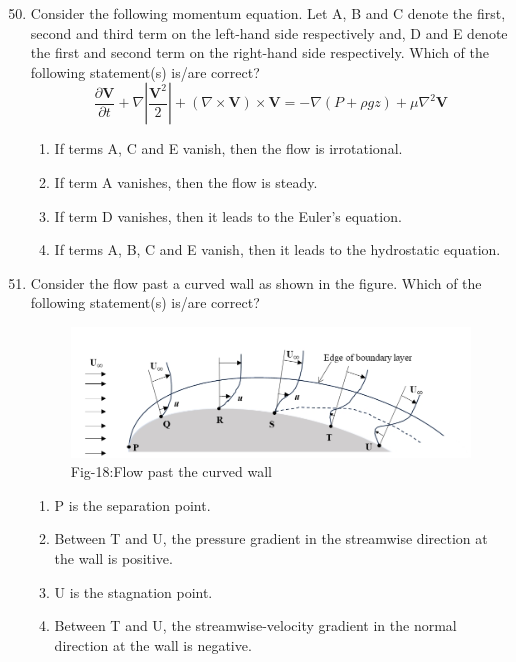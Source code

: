 \documentclass[journal]{IEEEtran}
\theoremstyle{remark}
\begin{document}
\begin{enumerate}[itemsep=1em]
\setcounter{enumi}{49}
\item Consider the following momentum equation. Let A, B and C denote the first, second and third term on the left-hand side respectively and, D and E denote the first and second term on the right-hand side respectively. Which of the following statement(s) is/are correct?  
\[
\frac{\partial \mathbf{V}}{\partial t}
+ \nabla \left| \frac{\mathbf{V}^2}{2} \right|
+ \left( \nabla \times \mathbf{V} \right) \times \mathbf{V}
= -\nabla \left( P + \rho g z \right)
+ \mu \nabla^2 \mathbf{V}
\]

\begin{enumerate}[ leftmargin=2.5em, labelsep=0.5em, itemsep=0.5em]
      \item If terms A, C and E vanish, then the flow is irrotational. 
      \item If term A vanishes, then the flow is steady. 
      \item If term D vanishes, then it leads to the Euler's equation. 
      \item If terms A, B, C and E vanish, then it leads to the hydrostatic equation. 
\end{enumerate}
\end{enumerate}

\begin{enumerate}[itemsep=1em]
\setcounter{enumi}{50}
\item Consider the flow past a curved wall as shown in the figure. Which of the following statement(s) is/are correct? 
\begin{figure}[H]
    \centering
    \includegraphics[width=0.6\columnwidth]{figs/fig-18.jpeg}
    \caption*{Fig-18:Flow past the curved wall}
    \label{fig-18}
\end{figure}


\newpage
\vspace*{0.25cm}

\begin{enumerate}[leftmargin=2.5em, labelsep=0.5em, itemsep=0.5em]
      \item P is the separation point.  
      \item Between T and U, the pressure gradient in the streamwise direction at the wall is positive.
      \item U is the stagnation point.  
      \item Between T and U, the streamwise-velocity gradient in the normal direction at the wall is negative. 
\end{enumerate}
\end{enumerate}
\end{document}
